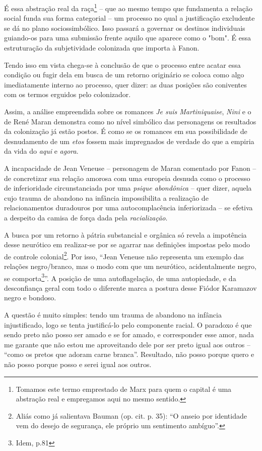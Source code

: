 É essa abstração real da raça\footnote{Tomamos este termo emprestado de
  Marx para quem o capital é uma abstração real e empregamos aqui no
  mesmo sentido.} -- que ao mesmo tempo que fundamenta a relação social
funda sua forma categorial -- um processo no qual a justificação
excludente se dá no plano sociossimbólico. Isso passará a governar os
destinos individuais guiando-os para uma submissão frente aquilo que
aparece como o "bom". É essa estruturação da subjetividade colonizada
que importa à Fanon.

Tendo isso em vista chega-se à conclusão de que o processo entre acatar
essa condição ou fugir dela em busca de um retorno originário se coloca
como algo imediatamente interno ao processo, quer dizer: as duas
posições são coniventes com os termos erguidos pelo colonizador.

Assim, a análise empreendida sobre os romances \emph{Je suis
Martiniquaise}, \emph{Nini} e o de René Maran demonstra como no nível
simbólico das personagens os resultados da colonização já estão postos.
É como se os romances em sua possibilidade de desnudamento de um
\emph{etos} fossem mais impregnados de verdade do que a empiria da vida
do \emph{aqui} e \emph{agora}.

A incapacidade de Jean Veneuse -- personagem de Maran comentado por
Fanon -- de concretizar sua relação amorosa com uma europeia desnuda
como o processo de inferioridade circunstanciada por uma \emph{psique
abondônica} -- quer dizer, aquela cujo trauma de abandono na infância
impossibilita a realização de relacionamentos duradouros por uma
autocomplacência inferiorizada -- se efetiva a despeito da camisa de
força dada pela \emph{racialização}.

A busca por um retorno à pátria substancial e orgânica só revela a
impotência desse neurótico em realizar-se por se agarrar nas definições
impostas pelo modo de controle colonial\footnote{Aliás como já
  salientava Bauman (op. cit. p. 35): ``O anseio por identidade vem do
  desejo de segurança, ele próprio um sentimento ambíguo''.}. Por isso,
``Jean Veneuse não representa um exemplo das relações negro/branco, mas
o modo com que um neurótico, acidentalmente negro, se comporta\footnote{Idem,
  p.81}''. A posição de uma autoflagelação, de uma autopiedade, e da
desconfiança geral com todo o diferente marca a postura desse Fiódor
Karamazov negro e bondoso.

A questão é muito simples: tendo um trauma de abandono na infância
injustificado, logo se tenta justificá-lo pelo componente racial. O
paradoxo é que sendo preto não posso ser amado e se for amado, e
corresponder esse amor, nada me garante que não estou me aproveitando
dele por ser preto igual aos outros -- ``como os pretos que adoram carne
branca''. Resultado, não posso porque quero e não posso porque posso e
serei igual aos outros.

